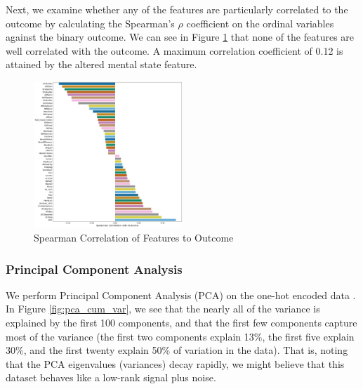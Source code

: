 \documentclass[11pt, letterpaper]{amsart}
\let\Oldsubsubsection\subsubsection
\renewcommand{\subsubsection}{\FloatBarrier\Oldsubsubsection}
\begin{document}
Next, we examine whether any of the features are particularly correlated to the outcome by calculating the Spearman's $\rho$ coefficient on the ordinal variables against the binary outcome. We can see in Figure \ref{fig:spearman_corr_to_outcome} that none of the features are well correlated with the outcome. A maximum correlation coefficient of 0.12 is attained by the altered mental state feature.
\begin{figure}
	\centering
	\includegraphics[width=0.5\textwidth]{spearman_corr_to_outcome.png}
	\caption{Spearman Correlation of Features to Outcome}\label{fig:spearman_corr_to_outcome}
\end{figure}

\subsubsection{Principal Component Analysis}

We perform Principal Component Analysis (PCA) on the one-hot encoded data \cite{pearson1901liii}. In Figure \ref{fig:pca_cum_var}, we see that the nearly all of the variance is explained by the first 100 components, and that the first few components capture most of the variance (the first two components explain 13\%, the first five explain 30\%, and the first twenty explain 50\% of variation in the data). That is, noting that the PCA eigenvalues (variances) decay rapidly, we might believe that this dataset behaves like a low-rank signal plus noise. 
\end{document}
